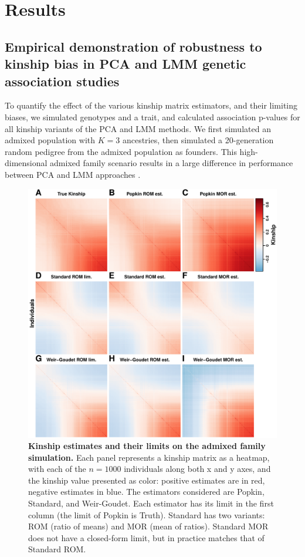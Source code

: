 \documentclass[11pt]{article}
\begin{document}
\section{Results}

\graphicspath{ {../data/} }

\subsection{Empirical demonstration of robustness to kinship bias in PCA and LMM genetic association studies}

To quantify the effect of the various kinship matrix estimators, and their limiting biases, we simulated genotypes and a trait, and calculated association p-values for all kinship variants of the PCA and LMM methods.
We first simulated an admixed population with $K=3$ ancestries, then simulated a 20-generation random pedigree from the admixed population as founders.
This high-dimensional admixed family scenario results in a large difference in performance between PCA and LMM approaches \citep{yao_limitations_2022}.

\begin{figure}[bp!]
  \centering
  \includegraphics[height=0.8\textheight]{sim-admix-n1000-m100000-k3-f0.3-s0.5-mc100-h0.8-g20-fes/kinship.pdf}
  \caption{
    {\bf Kinship estimates and their limits on the admixed family simulation.}
    Each panel represents a kinship matrix as a heatmap, with each of the $n=1000$ individuals along both x and y axes, and the kinship value presented as color: positive estimates are in red, negative estimates in blue.
    The estimators considered are Popkin, Standard, and Weir-Goudet.
    Each estimator has its limit in the first column (the limit of Popkin is Truth).
    Standard has two variants: ROM (ratio of means) and MOR (mean of ratios).
    Standard MOR does not have a closed-form limit, but in practice matches that of Standard ROM.
  }
  \label{fig:kinship_sim}
\end{figure}
\end{document}
